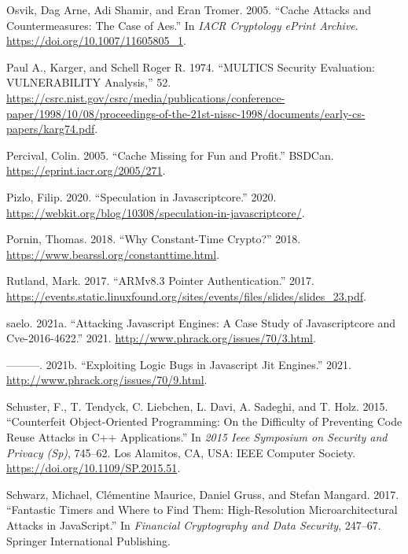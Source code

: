 \documentclass[a4paper,]{report}
\begin{document}
\leavevmode\hypertarget{ref-Osvik2005}{}%
Osvik, Dag Arne, Adi Shamir, and Eran Tromer. 2005. ``Cache Attacks and
Countermeasures: The Case of Aes.'' In \emph{IACR Cryptology ePrint
Archive}. \url{https://doi.org/10.1007/11605805_1}.

\leavevmode\hypertarget{ref-Karger1974}{}%
Paul A., Karger, and Schell Roger R. 1974. ``MULTICS Security
Evaluation: VULNERABILITY Analysis,'' 52.
\url{https://csrc.nist.gov/csrc/media/publications/conference-paper/1998/10/08/proceedings-of-the-21st-nissc-1998/documents/early-cs-papers/karg74.pdf}.

\leavevmode\hypertarget{ref-Percival2005}{}%
Percival, Colin. 2005. ``Cache Missing for Fun and Profit.'' BSDCan.
\url{https://eprint.iacr.org/2005/271}.

\leavevmode\hypertarget{ref-Pizlo2020}{}%
Pizlo, Filip. 2020. ``Speculation in Javascriptcore.'' 2020.
\url{https://webkit.org/blog/10308/speculation-in-javascriptcore/}.

\leavevmode\hypertarget{ref-Pornin2018}{}%
Pornin, Thomas. 2018. ``Why Constant-Time Crypto?'' 2018.
\url{https://www.bearssl.org/constanttime.html}.

\leavevmode\hypertarget{ref-Rutland2017}{}%
Rutland, Mark. 2017. ``ARMv8.3 Pointer Authentication.'' 2017.
\url{https://events.static.linuxfound.org/sites/events/files/slides/slides_23.pdf}.

\leavevmode\hypertarget{ref-saelo2021b}{}%
saelo. 2021a. ``Attacking Javascript Engines: A Case Study of
Javascriptcore and Cve-2016-4622.'' 2021.
\url{http://www.phrack.org/issues/70/3.html}.

\leavevmode\hypertarget{ref-saelo2021a}{}%
---------. 2021b. ``Exploiting Logic Bugs in Javascript Jit Engines.''
2021. \url{http://www.phrack.org/issues/70/9.html}.

\leavevmode\hypertarget{ref-Schuster2015}{}%
Schuster, F., T. Tendyck, C. Liebchen, L. Davi, A. Sadeghi, and T. Holz.
2015. ``Counterfeit Object-Oriented Programming: On the Difficulty of
Preventing Code Reuse Attacks in C++ Applications.'' In \emph{2015 Ieee
Symposium on Security and Privacy (Sp)}, 745--62. Los Alamitos, CA, USA:
IEEE Computer Society. \url{https://doi.org/10.1109/SP.2015.51}.

\leavevmode\hypertarget{ref-Schwarz2017}{}%
Schwarz, Michael, Clémentine Maurice, Daniel Gruss, and Stefan Mangard.
2017. ``Fantastic Timers and Where to Find Them: High-Resolution
Microarchitectural Attacks in JavaScript.'' In \emph{Financial
Cryptography and Data Security}, 247--67. Springer International
Publishing.
\end{document}
